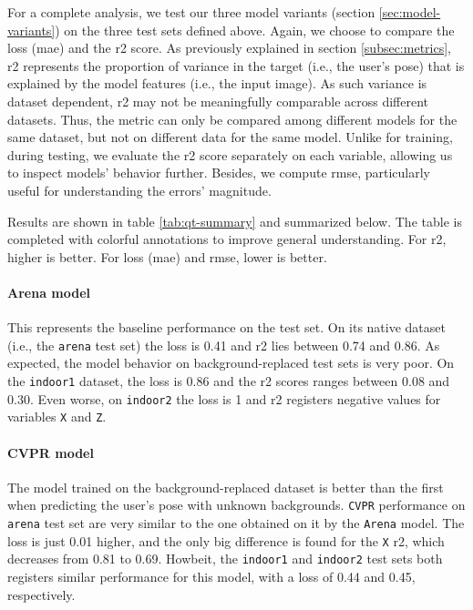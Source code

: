 For a complete analysis, we test our three model variants (section \ref{sec:model-variants}) on the three test sets defined above. Again, we choose to compare the loss (\gls{mae}) and the \gls{r2} score. As previously explained in section \ref{subsec:metrics}, \gls{r2} represents the proportion of variance in the target (i.e., the user's pose) that is explained by the model features (i.e., the input image). As such variance is dataset dependent, \gls{r2} may not be meaningfully comparable across different datasets. Thus, the metric can only be compared among different models for the same dataset, but not on different data for the same model. Unlike for training, during testing, we evaluate the \gls{r2} score separately on each variable, allowing us to inspect models' behavior further. Besides, we compute \gls{rmse}, particularly useful for understanding the errors' magnitude.

Results are shown in table \ref{tab:qt-summary} and summarized below. The table is completed with colorful annotations to improve general understanding. For \gls{r2}, higher is better. For loss (\gls{mae}) and \gls{rmse}, lower is better.

\paragraph*{Arena model}

This represents the baseline performance on the test set. On its native dataset (i.e., the \texttt{arena} test set) the loss is 0.41 and \gls{r2} lies between 0.74 and 0.86. As expected, the model behavior on background-replaced test sets is very poor. On the \texttt{indoor1} dataset, the loss is 0.86 and the \gls{r2} scores ranges between 0.08 and 0.30. Even worse, on \texttt{indoor2} the loss is 1 and \gls{r2} registers negative values for variables \texttt{X} and \texttt{Z}.

\paragraph*{CVPR model}

The model trained on the background-replaced dataset is better than the first when predicting the user's pose with unknown backgrounds. \texttt{CVPR} performance on \texttt{arena} test set are very similar to the one obtained on it by the \texttt{Arena} model. The loss is just 0.01 higher, and the only big difference is found for the \texttt{X} \gls{r2}, which decreases from 0.81 to 0.69. Howbeit, the \texttt{indoor1} and \texttt{indoor2} test sets both registers similar performance for this model, with a loss of 0.44 and 0.45, respectively.

